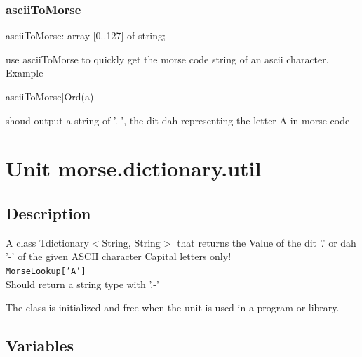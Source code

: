 \documentclass{report}
\newif\ifpdf
\begin{document}
\subsection*{asciiToMorse}
\fi
\label{morse.dictionary.ascii-asciiToMorse}
\begin{list}{}{
\setlength{\itemindent}{0cm}
\setlength{\listparindent}{0cm}
\setlength{\leftmargin}{\evensidemargin}
\addtolength{\leftmargin}{\tmplength}
\settowidth{\labelsep}{X}
\addtolength{\leftmargin}{\labelsep}
\setlength{\labelwidth}{\tmplength}
}
\item[\textbf{Declaration}\hfill]
\ifpdf
\begin{flushleft}
\fi
\begin{ttfamily}
asciiToMorse: array [0..127] of string;\end{ttfamily}

\ifpdf
\end{flushleft}
\fi

\par
\item[\textbf{Description}]
use asciiToMorse to quickly get the morse code string of an ascii character. Example \begin{ttfamily}asciiToMorse[Ord(a)]\end{ttfamily} shoud output a string of '.{-}', the dit{-}dah representing the letter A in morse code

\end{list}
\chapter{Unit morse.dictionary.util}
\label{morse.dictionary.util}
\section{Description}
A class Tdictionary{$<$}String, String{$>$} that returns the Value of the dit '.' or dah '{-}' of the given ASCII character Capital letters only! \texttt{\\\nopagebreak[3]
MorseLookup['A']\\
} Should return a string type with '.{-}'

The class is initialized and free when the unit is used in a program or library.
\section{Variables}
\ifpdf
\end{document}
